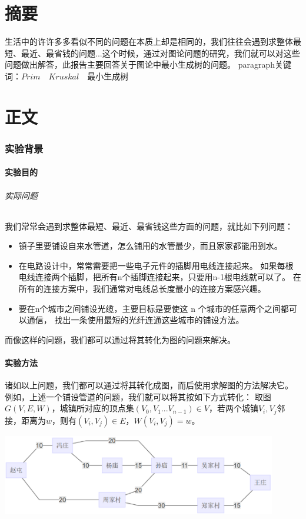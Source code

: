 \documentclass[a4paper,10pt]{ctexart}
\begin{document}
\part*{摘要}
生活中的许许多多看似不同的问题在本质上却是相同的，我们往往会遇到求整体最短、最近、最省钱的问题...这个时候，通过对图论问题的研究，我们就可以对这些问题做出解答，此报告主要回答关于图论中最小生成树的问题。
paragraph{关键词：}$Prim$\ \ $Kruskal$\ \ 最小生成树
\tableofcontents

\newpage
\part{正文}
\section{实验背景}

\subsection{实验目的}
\paragraph{实际问题} 我们常常会遇到求整体最短、最近、最省钱这些方面的问题，就比如下列问题：
\begin{itemize}
\item 镇子里要铺设自来水管道，怎么铺用的水管最少，而且家家都能用到水。
\item 在电路设计中，常常需要把一些电子元件的插脚用电线连接起来。 如果每根电线连接两个插脚，把所有n个插脚连接起来，只要用n-1根电线就可以了。 在所有的连接方案中，我们通常对电线总长度最小的连接方案感兴趣。
\item 要在n个城市之间铺设光缆，主要目标是要使这 n 个城市的任意两个之间都可以通信， 找出一条使用最短的光纤连通这些城市的铺设方法。
\end{itemize}
而像这样的问题，我们都可以通过将其转化为图的问题来解决。

\subsection{实验方法}
诸如以上问题，我们都可以通过将其转化成图，而后使用求解图的方法解决它。
例如，上述一个铺设管道的问题，我们就可以将其按如下方式转化：
取图$G(V,E,W)$，城镇所对应的顶点集$(V_0,V_1...V_{n-1}) \in V $，若两个城镇$V_i,V_j$邻接，距离为$w$，则有$(V_i,V_j)\in E$，$W(V_i,V_j)=w$。

\includegraphics[width=0.9\textwidth]{../Pics/MiniTree.eps}
\end{document}

